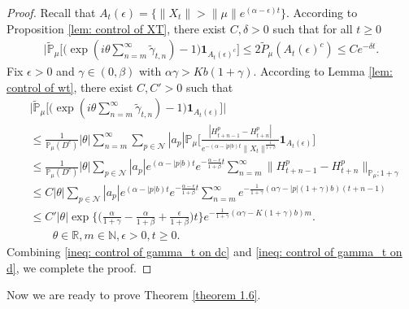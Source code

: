 \documentclass[12pt,a4paper]{amsart}
\theoremstyle{plain}
\theoremstyle{definition}
\numberwithin{equation}{section}
\begin{document}
\begin{proof}
Recall that $A_t(\epsilon)=\{\|X_t\|>\|\mu\|e^{(\alpha-\epsilon) t}\}$. According to Proposition \ref{lem: control of XT}, there exist
	$C,\delta>0$ such that for all $t\geq 0$
\begin{align}\label{ineq: control of gamma_t on dc}
     \Big|\tilde{\mathbb{P}}_{\mu}\Big[\big(\exp(i\theta \sum_{n=m}^{\infty}\tilde{\gamma}_{t,n})-1\big)\mathbf{1}_{A_t(\epsilon)^c}\Big]\leq 2\tilde{P}_{\mu}(A_t(\epsilon)^c)\leq C e^{-\delta t}.
\end{align}
	 Fix $\epsilon>0$ and $\gamma\in(0,\beta)$ with $\alpha\gamma>Kb(1+\gamma)$.  According to Lemma \ref{lem: control of wt}, there exist $C,C'>0$ such that
\begin{align}\label{ineq: control of gamma_t on d}
  &\Big|\tilde{\mathbb{P}}_{\mu}\Big[\big(\exp(i\theta \sum_{n=m}^{\infty}\tilde{\gamma}_{t,n})-1\big)\mathbf{1}_{A_t(\epsilon)}\Big]\Big|\\
  &\leq \frac{1}{\mathbb{P}_{\mu}(D^c)}|\theta|\sum_{n=m}^{\infty}\sum_{p\in \mathcal{N}}|a_p|\mathbb{P}_{\mu}\Big[\frac{|H_{t+n-1}^p-H_{t+n}^p|}{e^{-(\alpha-|p|b)t}\|X_t\|^{\frac{1}{1+\beta}}}\mathbf{1}_{A_t(\epsilon)}\Big]\\
  &\leq  \frac{1}{\mathbb{P}_{\mu}(D^c)}|\theta|\sum_{p\in \mathcal{N}}|a_p|e^{(\alpha-|p|b)t}e^{-\frac{\alpha-\epsilon}{1+\beta}t}\sum_{n=m}^{\infty}\|H_{t+n-1}^p-H_{t+n}^p\|_{\mathbb{P}_{\mu};1+\gamma}\\
  &\leq C|\theta|\sum_{p\in \mathcal{N}}|a_p|e^{(\alpha-|p|b)t}e^{-\frac{\alpha-\epsilon}{1+\beta}t}\sum_{n=m}^{\infty}e^{-\frac{1}{1+\gamma}(\alpha\gamma-|p|(1+\gamma)b)(t+n-1)}\\
  &\leq C'|\theta|\exp\Big\{\Big(\frac{\alpha}{1+\gamma}-\frac{\alpha}{1+\beta}+\frac{\epsilon}{1+\beta}\Big)t\Big\}e^{-\frac{1}{1+\gamma}(\alpha\gamma-K(1+\gamma)b)m}.\\
  & \qquad\theta\in\mathbb{R}, m\in \mathbb{N}, \epsilon>0, t\geq 0.
\end{align}
Combining \eqref{ineq: control of gamma_t on dc} and \eqref{ineq: control of gamma_t on d}, we complete the proof.
\end{proof}
Now we are ready to prove Theorem \ref{theorem 1.6}.
\bigskip
\end{document}

